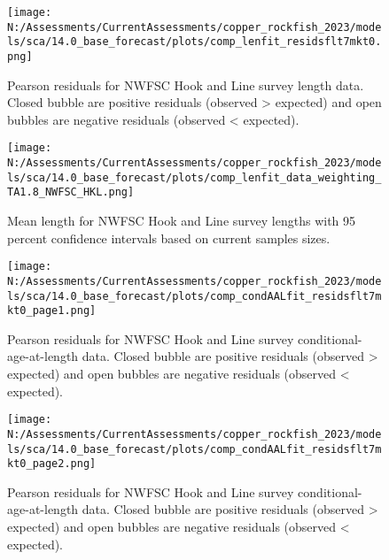 \documentclass[11pt,
  english,
  letterpaper,
]{article}
\begin{document}
\pagebreak

\begin{figure}
\centering
\texttt{[image: N:/Assessments/CurrentAssessments/copper\_rockfish\_2023/models/sca/14.0\_base\_forecast/plots/comp\_lenfit\_residsflt7mkt0.png]}
\caption{Pearson residuals for NWFSC Hook and Line survey length data. Closed bubble are positive residuals (observed \textgreater{} expected) and open bubbles are negative residuals (observed \textless{} expected).\label{fig:nwfsc-hkl-pearson}}
\end{figure}

\pagebreak

\begin{figure}
\centering
\texttt{[image: N:/Assessments/CurrentAssessments/copper\_rockfish\_2023/models/sca/14.0\_base\_forecast/plots/comp\_lenfit\_data\_weighting\_TA1.8\_NWFSC\_HKL.png]}
\caption{Mean length for NWFSC Hook and Line survey lengths with 95 percent confidence intervals based on current samples sizes.\label{fig:nwfsc-hkl-mean-len-fit}}
\end{figure}

\pagebreak

\begin{figure}
\centering
\texttt{[image: N:/Assessments/CurrentAssessments/copper\_rockfish\_2023/models/sca/14.0\_base\_forecast/plots/comp\_condAALfit\_residsflt7mkt0\_page1.png]}
\caption{Pearson residuals for NWFSC Hook and Line survey conditional-age-at-length data. Closed bubble are positive residuals (observed \textgreater{} expected) and open bubbles are negative residuals (observed \textless{} expected).\label{fig:nwfsc-hkl-age-pearson-1}}
\end{figure}

\pagebreak

\begin{figure}
\centering
\texttt{[image: N:/Assessments/CurrentAssessments/copper\_rockfish\_2023/models/sca/14.0\_base\_forecast/plots/comp\_condAALfit\_residsflt7mkt0\_page2.png]}
\caption{Pearson residuals for NWFSC Hook and Line survey conditional-age-at-length data. Closed bubble are positive residuals (observed \textgreater{} expected) and open bubbles are negative residuals (observed \textless{} expected).\label{fig:nwfsc-hkl-age-pearson-2}}
\end{figure}

\pagebreak
\end{document}
